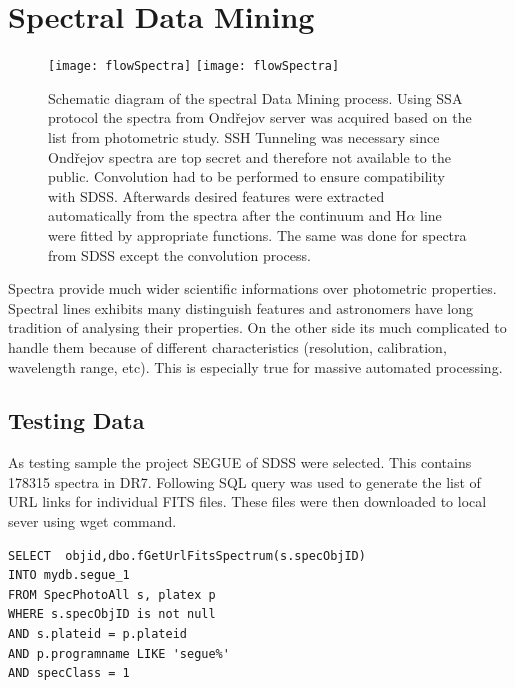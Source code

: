 \section{Spectral Data Mining}

   \begin{figure}[!htbp]
      \begin{center}
        \leavevmode
        \ifpdf
        \texttt{[image: flowSpectra]}
        \else
        \texttt{[image: flowSpectra]}
        \fi
        \caption{Schematic diagram of the spectral Data Mining
          process. Using SSA protocol the spectra from Ondřejov server
          was acquired based on the list from photometric study. SSH
          Tunneling was necessary since Ondřejov spectra are top
          secret and therefore not available to the public. Convolution
          had to be performed to ensure compatibility with
          SDSS. Afterwards desired features were extracted
          automatically from the spectra after the continuum and
          H$\alpha$ line were fitted by appropriate functions. The
          same was done for spectra from SDSS except the convolution
          process.}
        \label{FigFlowSpectra}
      \end{center}
    \end{figure}

 
\clearpage

Spectra provide much wider scientific informations over photometric
properties. Spectral lines exhibits many distinguish features and
astronomers have long tradition of analysing their properties. On the
other side its much complicated to handle them because of different
characteristics (resolution, calibration, wavelength range, etc). This
is especially true for massive automated processing.  

\subsection{Testing Data}
As testing sample the project SEGUE of SDSS were selected. This
contains 178315 spectra in DR7. Following SQL query was used to
generate the list of URL links for individual FITS files. These files
were then downloaded to local sever using wget command.

\begin{lstlisting}
SELECT  objid,dbo.fGetUrlFitsSpectrum(s.specObjID)                                                           
INTO mydb.segue_1                                                                                     
FROM SpecPhotoAll s, platex p                                                                         
WHERE s.specObjID is not null                                                                         
AND s.plateid = p.plateid                                                                             
AND p.programname LIKE 'segue%'                                                                       
AND specClass = 1
\end{lstlisting}

